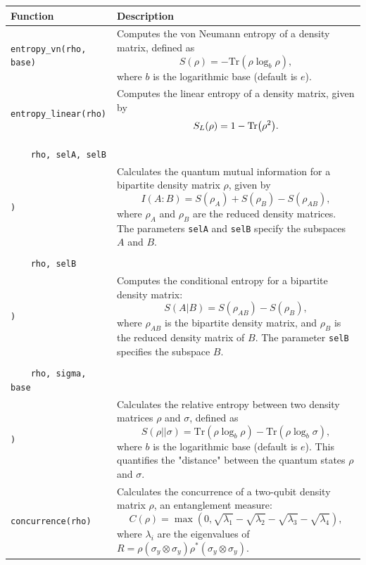 \documentclass[preprint,3p,sort&compress]{elsarticle}
\def\code#1{\texttt{#1}}
\begin{document}
\newpage

\begin{table}[!hp]
\centering
 \renewcommand{\arraystretch}{1.3}
\begin{tabular}{@{}lp{11cm}@{}}
\toprule
\textbf{Function} & \textbf{Description} \\ 
\bottomrule

\code{entropy\_vn(rho, base)} & Computes the von Neumann entropy of a density matrix, defined as
\[
S(\rho) = -\text{Tr}(\rho \log_b \rho) ,
\]
where $b$ is the logarithmic base (default is $e$). \\

\code{entropy\_linear(rho)} & Computes the linear entropy of a density matrix, given by
\[
S_L(\rho) = 1 - \Tr(\rho^2) .
\]
\\ 

\makecell{\code{entropy\_mutual(} \\ \code{~~~~rho, selA, selB} \\ \code{)}} & Calculates the quantum mutual information for a bipartite density matrix $\rho$, given by
\[
I(A:B) = S(\rho_A) + S(\rho_B) - S(\rho_{AB}) ,
\]
where $\rho_A$ and $\rho_B$ are the reduced density matrices. The parameters \code{selA} and \code{selB} specify the subspaces $A$ and $B$. \\ 

\makecell{\code{entropy\_conditional(} \\ \code{~~~~rho, selB} \\ \code{)}} & Computes the conditional entropy for a bipartite density matrix:
\[
S(A|B) = S(\rho_{AB}) - S(\rho_B) ,
\]
where $\rho_{AB}$ is the bipartite density matrix, and $\rho_B$ is the reduced density matrix of $B$. The parameter \code{selB} specifies the subspace $B$.\\ 

\makecell{\code{entropy\_relative(} \\ \code{~~~~rho, sigma, base} \\ \code{)}} & Calculates the relative entropy between two density matrices $\rho$ and $\sigma$, defined as
\[
S(\rho || \sigma) = \text{Tr}(\rho \log_b \rho) - \text{Tr}(\rho \log_b \sigma) ,
\]
where $b$ is the logarithmic base (default is $e$).
This quantifies the "distance" between the quantum states $\rho$ and $\sigma$. \\ 


\code{concurrence(rho)} & Calculates the concurrence of a two-qubit density matrix $\rho$, an entanglement measure:
\[
C(\rho) = \max\left(0, \sqrt{\lambda_1} - \sqrt{\lambda_2} - \sqrt{\lambda_3} - \sqrt{\lambda_4}\right) ,
\]
where $\lambda_i$ are the eigenvalues of $R = \rho (\sigma_y \otimes \sigma_y) \rho^* (\sigma_y \otimes \sigma_y)$. \\ 


\end{tabular}
\end{table}
\end{document}
